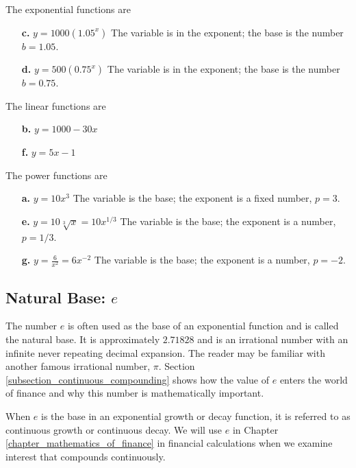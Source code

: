 \begin{solution}
    The exponential functions are
    \begin{itemize}
        \item[\textbf{c.}] \( y = 1000(1.05^x) \) The variable is in the exponent; the base is the number \( b = 1.05 \).
        \item[\textbf{d.}] \( y = 500(0.75^x) \) The variable is in the exponent; the base is the number \( b = 0.75 \).
    \end{itemize}

    The linear functions are
    \begin{itemize}
        \item[\textbf{b.}] \( y = 1000 - 30x \)
        \item[\textbf{f.}] \( y = 5x - 1 \)
    \end{itemize}

    The power functions are
    \begin{itemize}
        \item[\textbf{a.}] \( y = 10x^3 \) The variable is the base; the exponent is a fixed number, \( p = 3 \).
        \item[\textbf{e.}] \( y = 10\sqrt[3]{x} = 10x^{1/3} \) The variable is the base; the exponent is a number, \( p = 1/3 \).
        \item[\textbf{g.}] \( y = \frac{6}{x^2} = 6x^{-2} \) The variable is the base; the exponent is a number, \( p = -2 \).
    \end{itemize}
\end{solution}

\subsection{Natural Base: \( e \)}

The number \( e \) is often used as the base of an exponential function and is called the natural base. It is approximately \( 2.71828 \) and is an irrational number with an infinite never repeating decimal expansion. The reader may be familiar with another famous irrational number, \( \pi\). Section \ref{subsection_continuous_compounding} shows how the value of \( e \) enters the world of finance and why this number is mathematically important.

When \( e \) is the base in an exponential growth or decay function, it is referred to as continuous growth or continuous decay. We will use \( e \) in Chapter \ref{chapter_mathematics_of_finance} in financial calculations when we examine interest that compounds continuously.

